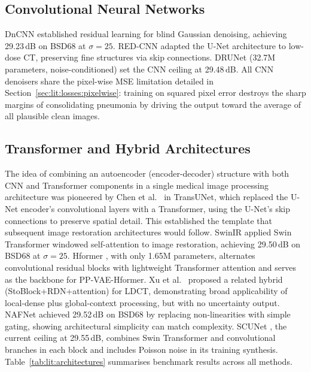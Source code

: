 \documentclass[12pt, a4paper, twoside, openright]{book}
\begin{document}
\subsection{Convolutional Neural Networks}
\label{sec:lit:architectures:cnn}

DnCNN \cite{zhang_beyond_2017} established residual learning for blind Gaussian denoising, achieving 29.23\,dB on BSD68 at $\sigma=25$. RED-CNN \cite{chen_low-dose_2017} adapted the U-Net architecture to low-dose CT, preserving fine structures via skip connections. DRUNet \cite{zhang_drunet_2021} (32.7M parameters, noise-conditioned) set the CNN ceiling at 29.48\,dB. All CNN denoisers share the pixel-wise MSE limitation detailed in Section~\ref{sec:lit:losses:pixelwise}: training on squared pixel error destroys the sharp margins of consolidating pneumonia by driving the output toward the average of all plausible clean images.

\subsection{Transformer and Hybrid Architectures}
\label{sec:lit:architectures:transformer}

The idea of combining an autoencoder (encoder-decoder) structure with both CNN and Transformer components in a single medical image processing architecture was pioneered by Chen et al.\ \cite{chen_transunet_2021} in TransUNet, which replaced the U-Net encoder's convolutional layers with a Transformer, using the U-Net's skip connections to preserve spatial detail. This established the template that subsequent image restoration architectures would follow. SwinIR \cite{liang_swinir_2021} applied Swin Transformer windowed self-attention to image restoration, achieving 29.50\,dB on BSD68 at $\sigma=25$. Hformer \cite{zhang_hformer_2023}, with only 1.65M parameters, alternates convolutional residual blocks with lightweight Transformer attention and serves as the backbone for PP-VAE-Hformer. Xu et al.\ \cite{xuLowdoseComputedTomography2025} proposed a related hybrid (StoBlock+RDN+attention) for LDCT, demonstrating broad applicability of local-dense plus global-context processing, but with no uncertainty output. NAFNet \cite{chen_nafnet_2022} achieved 29.52\,dB on BSD68 by replacing non-linearities with simple gating, showing architectural simplicity can match complexity. SCUNet \cite{zhang_scunet_2023}, the current ceiling at 29.55\,dB, combines Swin Transformer and convolutional branches in each block and includes Poisson noise in its training synthesis. Table~\ref{tab:lit:architectures} summarises benchmark results across all methods.
\end{document}
